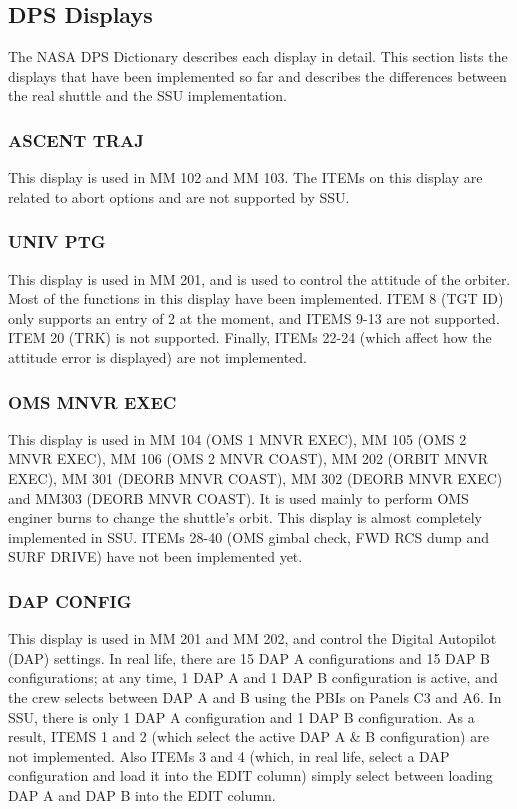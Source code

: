 \documentclass[Space_Shuttle_Ultra_Manual.tex]{subfiles}
\begin{document}
\subsection{DPS Displays}
\begin{multicols*}{2}
\renewcommand{\cfttoctitlefont}{\bf}
\localtableofcontents
\label{sec:dps-displays}
The NASA DPS Dictionary describes each display in detail. This section lists the displays that have been implemented so far and describes the differences between the real shuttle and the SSU implementation.

\subsubsection{ASCENT TRAJ}
This display is used in MM 102 and MM 103. The ITEMs on this display are related to abort options and are not supported by SSU.

\subsubsection{UNIV PTG}
This display is used in MM 201, and is used to control the attitude of the orbiter. Most of the functions in this display have been implemented. ITEM 8 (TGT ID) only supports an entry of 2 at the moment, and ITEMS 9-13 are not supported. ITEM 20 (TRK) is not supported. Finally, ITEMs 22-24 (which affect how the attitude error is displayed) are not implemented.

\subsubsection{OMS MNVR EXEC}
This display is used in MM 104 (OMS 1 MNVR EXEC), MM 105 (OMS 2 MNVR EXEC), MM 106 (OMS 2 MNVR COAST), MM 202 (ORBIT MNVR EXEC), MM 301 (DEORB MNVR COAST), MM 302 (DEORB MNVR EXEC) and MM303 (DEORB MNVR COAST). It is used mainly to perform OMS enginer burns to change the shuttle's orbit.
This display is almost completely implemented in SSU. ITEMs 28-40 (OMS gimbal check, FWD RCS dump and SURF DRIVE) have not been implemented yet.

\subsubsection{DAP CONFIG}
This display is used in MM 201 and MM 202, and control the Digital Autopilot (DAP) settings. In real life, there are 15 DAP A configurations and 15 DAP B configurations; at any time, 1 DAP A and 1 DAP B configuration is active, and the crew selects between DAP A and B using the PBIs on Panels C3 and A6. In SSU, there is only 1 DAP A configuration and 1 DAP B configuration. As a result, ITEMS 1 and 2 (which select the active DAP A \& B configuration) are not implemented. Also ITEMs 3 and 4 (which, in real life, select a DAP configuration and load it into the EDIT column) simply select between loading DAP A and DAP B into the EDIT column.


\end{multicols*}
\end{document}
